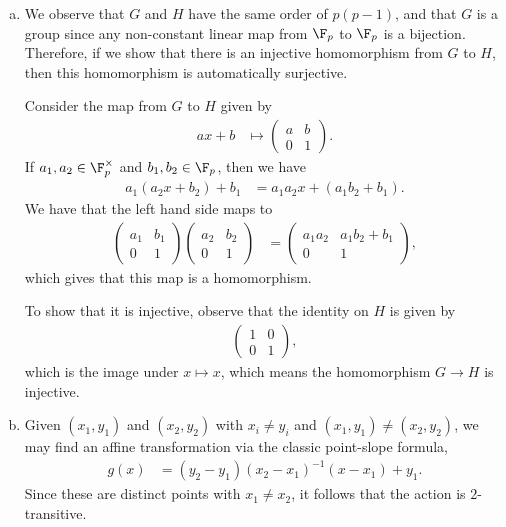 \documentclass[10pt]{mypackage}
\begin{document}
\begin{solution}\hfill
  \begin{enumerate}[(a)]
    \item We observe that $G$ and $H$ have the same order of $p\left( p-1 \right)$, and that $G$ is a group since any non-constant linear map from $\F_p$ to $\F_p$ is a bijection. Therefore, if we show that there is an injective homomorphism from $G$ to $H$, then this homomorphism is automatically surjective.

      Consider the map from $G$ to $H$ given by 
      \begin{align*}
        ax + b &\mapsto \begin{pmatrix}a & b \\ 0 & 1\end{pmatrix}.
      \end{align*}
      If $a_1,a_2\in \F_{p}^{\times}$ and $b_1,b_2\in \F_p$, then we have
      \begin{align*}
        a_1\left( a_2x + b_2 \right) + b_1 &= a_1a_2 x + \left( a_1b_2 + b_1 \right).
      \end{align*}
      We have that the left hand side maps to
      \begin{align*}
        \begin{pmatrix}a_1 & b_1 \\ 0 & 1\end{pmatrix}\begin{pmatrix}a_2 & b_2 \\ 0 & 1\end{pmatrix} &= \begin{pmatrix}a_1a_2 & a_1b_2 + b_1\\0 & 1\end{pmatrix},
      \end{align*}
      which gives that this map is a homomorphism.

      To show that it is injective, observe that the identity on $H$ is given by
      \begin{align*}
        \begin{pmatrix}1 & 0 \\ 0 & 1\end{pmatrix},
      \end{align*}
      which is the image under $x\mapsto x$, which means the homomorphism $G\rightarrow H$ is injective.
    \item Given $\left( x_1,y_1 \right)$ and $\left( x_2,y_2 \right)$ with $x_i\neq y_i$ and $\left( x_1,y_1 \right)\neq \left( x_2,y_2 \right)$, we may find an affine transformation via the classic point-slope formula,
      \begin{align*}
        g(x) &= \left( y_2-y_1 \right)\left( x_2-x_1 \right)^{-1}\left( x-x_1 \right) + y_1.
      \end{align*}
      Since these are distinct points with $x_1\neq x_2$, it follows that the action is $2$-transitive.
  \end{enumerate}
\end{solution}
\end{document}
